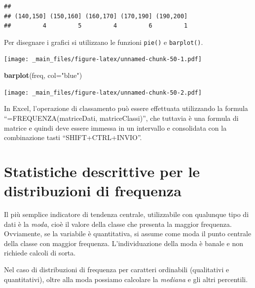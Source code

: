 \documentclass[a4paper,12pt,oneside]{book}
\newenvironment{Shaded}{\begin{snugshade}}{\end{snugshade}}
\newcommand{\KeywordTok}[1]{\textcolor[rgb]{0.13,0.29,0.53}{\textbf{#1}}}
\newcommand{\DataTypeTok}[1]{\textcolor[rgb]{0.13,0.29,0.53}{#1}}
\newcommand{\StringTok}[1]{\textcolor[rgb]{0.31,0.60,0.02}{#1}}
\newcommand{\OperatorTok}[1]{\textcolor[rgb]{0.81,0.36,0.00}{\textbf{#1}}}
\newcommand{\NormalTok}[1]{#1}
\begin{document}
\begin{verbatim}
## 
## (140,150] (150,160] (160,170] (170,190] (190,200] 
##         4         5         4         6         1
\end{verbatim}

Per disegnare i grafici si utilizzano le funzioni \texttt{pie()} e
\texttt{barplot()}.

\begin{Shaded}
\end{Shaded}

\texttt{[image: \_main\_files/figure-latex/unnamed-chunk-50-1.pdf]}

\begin{Shaded}
\begin{Highlighting}[]
\KeywordTok{barplot}\NormalTok{(freq, }\DataTypeTok{col=}\StringTok{"blue"}\NormalTok{) }
\end{Highlighting}
\end{Shaded}

\texttt{[image: \_main\_files/figure-latex/unnamed-chunk-50-2.pdf]}

In Excel, l'operazione di classamento può essere effettuata utilizzando
la formula ``=FREQUENZA(matriceDati, matriceClassi)'', che tuttavia è
una formula di matrice e quindi deve essere immessa in un intervallo e
consolidata con la combinazione tasti ``SHIFT+CTRL+INVIO''.

\section{Statistiche descrittive per le distribuzioni di
frequenza}\label{statistiche-descrittive-per-le-distribuzioni-di-frequenza}

Il più semplice indicatore di tendenza centrale, utilizzabile con
qualunque tipo di dati è la \emph{moda}, cioè il valore della classe che
presenta la maggior frequenza. Ovviamente, se la variabile è
quantitativa, si assume come moda il punto centrale della classe con
maggior frequenza. L'individuazione della moda è banale e non richiede
calcoli di sorta.

Nel caso di distribuzioni di frequenza per caratteri ordinabili
(qualitativi e quantitativi), oltre alla moda possiamo calcolare la
\emph{mediana} e gli altri percentili.
\end{document}
